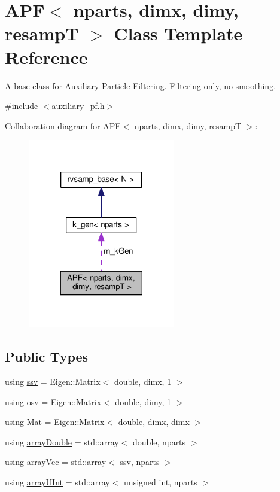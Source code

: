 \hypertarget{classAPF}{}\section{A\+PF$<$ nparts, dimx, dimy, resampT $>$ Class Template Reference}
\label{classAPF}


A base-\/class for Auxiliary Particle Filtering. Filtering only, no smoothing.  




{\ttfamily \#include $<$auxiliary\+\_\+pf.\+h$>$}



Collaboration diagram for A\+PF$<$ nparts, dimx, dimy, resampT $>$\+:\nopagebreak
\begin{figure}[H]
\begin{center}
\leavevmode
\includegraphics[width=182pt]{classAPF__coll__graph}
\end{center}
\end{figure}
\subsection*{Public Types}
\begin{DoxyCompactItemize}
\item 
using \hyperlink{classAPF_add8c737c90d68dc165d1e60dcd6b3b20}{ssv} = Eigen\+::\+Matrix$<$ double, dimx, 1 $>$
\item 
using \hyperlink{classAPF_aa3975009cab0e9e8945862884f091620}{osv} = Eigen\+::\+Matrix$<$ double, dimy, 1 $>$
\item 
using \hyperlink{classAPF_a8e867c46870835e2103aee00f13f0be7}{Mat} = Eigen\+::\+Matrix$<$ double, dimx, dimx $>$
\item 
using \hyperlink{classAPF_a004eb76b0bd0c79820674bdeb5a6c2c1}{array\+Double} = std\+::array$<$ double, nparts $>$
\item 
using \hyperlink{classAPF_a58fdbb8fc5629feb9bb5fe9a9de19554}{array\+Vec} = std\+::array$<$ \hyperlink{classAPF_add8c737c90d68dc165d1e60dcd6b3b20}{ssv}, nparts $>$
\item 
using \hyperlink{classAPF_a43238fa97dbb1862121ea2aa6f2a9dd1}{array\+U\+Int} = std\+::array$<$ unsigned int, nparts $>$
\end{DoxyCompactItemize}
